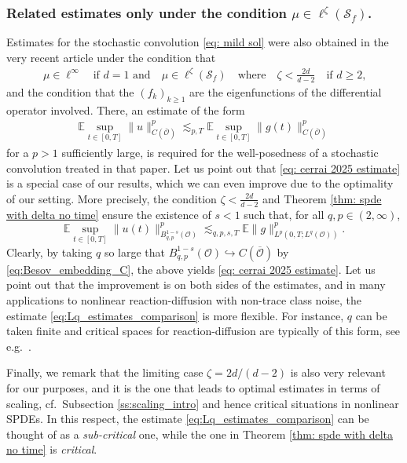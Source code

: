 \documentclass[reqno]{amsart}
\theoremstyle{plain}
\theoremstyle{remark}
\theoremstyle{plain}
\numberwithin{equation}{section}
\newcommand\cO{\mathcal{O}}
\newcommand{\E}{{\mathbb E}}
\newcommand{\1}{\one}
\newcommand{\embed}{\hookrightarrow}
\newcommand{\Sf}{\mathcal{S}_{f}}
\begin{document}
\subsubsection{Related estimates only under the condition $\mu\in\ell^\zeta(\Sf)$.}
\label{sss:comparison_new_2}
Estimates for the stochastic convolution \eqref{eq: mild sol} were also obtained in the very recent article \cite{cerrai2025nonlinear} under the condition that 
\begin{align}
\label{eq: zeta condition comparison 2025}
\mu\in\ell^\infty
\quad\text{if $d=1$ and}\quad
\mu\in\ell^\zeta(\Sf)
\quad\text{where}\quad \zeta<\frac{2d}{d-2}\quad\text{if $d\geq 2$,}
\end{align}
and the condition that the $(f_k)_{k\geq 1}$ are the eigenfunctions of the differential operator involved. There, an estimate of the form 
\begin{align}
    \label{eq: cerrai 2025 estimate}
    \E\sup_{t\in [0,T]}\|u\|^p_{C(\overline{\cO})}\lesssim_{p,T} \E\sup_{t\in [0,T]}\|g(t)\|_{C(\overline{\cO})}^p
\end{align}
for a $p>1$ sufficiently large, 
is required for the well-posedness of a stochastic convolution treated in that paper. 
Let us point out that \eqref{eq: cerrai 2025 estimate} is a special case of our results, which we can even improve due to the optimality of our setting. More precisely, the condition $\zeta<\frac{2d}{d-2}$ and Theorem \ref{thm: spde with delta no time} ensure the existence of $s<1$ such that, for all $q,p\in (2,\infty)$,
\begin{equation}
\label{eq:Lq_estimates_comparison}
\E\sup_{t\in [0,T]}\|u(t)\|_{B^{1-s}_{q,p}(\cO)}^p \lesssim_{q,p,s,T} \E \|g\|_{L^p(0,T;L^q(\cO))}^p.
\end{equation} 
Clearly, by taking $q$ so large that $B^{1-s}_{q,p}(\cO)\embed C(\overline{\cO})$ by \eqref{eq:Besov_embedding_C}, the above yields \eqref{eq: cerrai 2025 estimate}. Let us point out that the improvement is on both sides of the estimates, and in many applications to nonlinear reaction-diffusion with non-trace class noise, the estimate \eqref{eq:Lq_estimates_comparison} is more flexible. For instance, $q$ can be taken finite and critical spaces for reaction-diffusion are typically of this form, see e.g.\ \cite[Subsection 1.4]{AVreaction-local}. 


Finally, we remark that the limiting case $\zeta=2d/(d-2)$ is also very relevant for our purposes, and it is the one that leads to optimal estimates in terms of scaling, cf.\ Subsection \ref{ss:scaling_intro} and hence critical situations in nonlinear SPDEs. In this respect, the estimate \eqref{eq:Lq_estimates_comparison} can be thought of as a \emph{sub-critical} one, while the one in Theorem \ref{thm: spde with delta no time} is \emph{critical}. 
\end{document}
